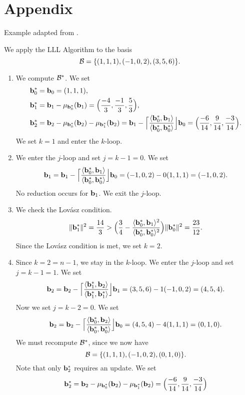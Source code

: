 \documentclass[a4paper,12pt]{article}
\begin{document}
\section{Appendix}
\begin{app}

Example adapted from \cite{Bosma}. 

We apply the LLL Algorithm to the  basis $$\mathcal{B} = \lbrace (1,1,1), (-1,0,2), (3,5,6) \rbrace.$$
\begin{enumerate}
    \item We compute $\mathcal{B}^*$. We set 
        \begin{align*}
        \mathbf{b}_0^{*} &= \mathbf{b}_0 = (1,1,1), \\ 
        \mathbf{b}_1^{*} &= \mathbf{b}_1 - \mu_{\mathbf{b}_0^*}(\mathbf{b}_1) = \Big(\frac{-4}{3}, \frac{-1}{3}, \frac{5}{3}\Big) , \\
        \mathbf{b}_2^{*} &= \mathbf{b}_2 - \mu_{\mathbf{b}_0^*}(\mathbf{b}_2) - \mu_{\mathbf{b}_1^*}(\mathbf{b}_2) = \mathbf{b}_1 - \Big\lceil \frac{\langle\mathbf{b}_0^{*},\mathbf{b}_1\rangle}{\langle\mathbf{b}_0^{*},\mathbf{b}_0^{*}\rangle} \Big\rfloor\mathbf{b}_0 =  \Big(\frac{-6}{14},\frac{9}{14},\frac{-3}{14}\Big).
        \end{align*} We set $k = 1$ and enter the $k$-loop.
    \item We enter the $j$-loop and set $j = k-1 = 0$. We set $$\mathbf{b}_1 = \mathbf{b}_1 - \Big\lceil \frac{\langle\mathbf{b}_0^{*},\mathbf{b}_1\rangle}{\langle\mathbf{b}_0^{*},\mathbf{b}_0^{*}\rangle} \Big\rfloor\mathbf{b}_0 = (-1,0,2) - 0(1,1,1) = (-1,0,2).$$ No reduction occurs for $\mathbf{b}_1$. We exit the $j$-loop.
    \item We check the Lov\'asz condition.
        $$ \|\mathbf{b}_1^{*}\|^2 = \frac{14}{3} > \Big(\frac{3}{4} - \frac{\langle \mathbf{b}_{0}^{*}, \mathbf{b}_{1} \rangle^{2}}{\langle \mathbf{b}_{0}^{*}, \mathbf{b}_{0}^{*} \rangle^{2}}\Big)\|\mathbf{b}_{0}^*\|^2 =  \frac{23}{12}. $$
        Since the Lov\'asz condition is met, we set $k = 2$.
    \item Since $k = 2 = n-1$, we stay in the $k$-loop. We enter the $j$-loop and set $j = k-1 = 1$. We set 
        $$ \mathbf{b}_2 = \mathbf{b}_2 - \Big\lceil \frac{\langle\mathbf{b}_1^{*},\mathbf{b}_2\rangle}{\langle\mathbf{b}_1^{*},\mathbf{b}_1^{*}\rangle} \Big\rfloor\mathbf{b}_1 = (3,5,6) - 1(-1,0,2) = (4,5,4). $$
        Now we set $j = k-2 = 0$. We set 
        $$\mathbf{b}_2 = \mathbf{b}_2 - \Big\lceil \frac{\langle\mathbf{b}_0^{*},\mathbf{b}_2\rangle}{\langle\mathbf{b}_0^{*},\mathbf{b}_0^{*}\rangle} \Big\rfloor\mathbf{b}_0 = (4,5,4) - 4(1,1,1) = (0,1,0).$$ We must recompute $\mathcal{B}^*$, since we now have $$\mathcal{B} = \lbrace (1,1,1), (-1,0,2), (0,1,0)\rbrace.$$ Note that only $\mathbf{b}_2^{*}$ requires an update. We set $$\mathbf{b}_2^{*} = \mathbf{b}_2 - \mu_{\mathbf{b}_0^*}(\mathbf{b}_2) - \mu_{\mathbf{b}_1^*}(\mathbf{b}_2) = \Big(\frac{-6}{14},\frac{9}{14},\frac{-3}{14}\Big)$$

\end{enumerate}
\end{app}
\end{document}
